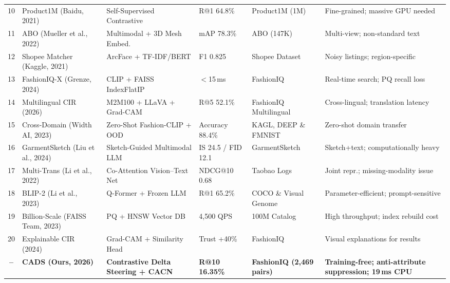 \documentclass[conference]{IEEEtran}
\begin{document}
\begin{table}[!t]
{\begin{tabular}{@{}clllll@{}}
10 & Product1M (Baidu, 2021)~\cite{baidu2021product1m}                   & Self-Supervised Contrastive                    & R@1 64.8\%              & Product1M (1M)               & Fine-grained; massive GPU needed \\
11 & ABO (Mueller et al., 2022)~\cite{mueller2022abo}                    & Multimodal + 3D Mesh Embed.                    & mAP 78.3\%              & ABO (147K)                   & Multi-view; non-standard text \\
12 & Shopee Matcher (Kaggle, 2021)~\cite{kaggle2021shopee}               & ArcFace + TF-IDF/BERT                          & F1 0.825                & Shopee Dataset               & Noisy listings; region-specific \\
13 & FashionIQ-X (Grenze, 2024)~\cite{grenze2024fashioniqx}             & CLIP + FAISS IndexFlatIP                       & $<$15\,ms               & FashionIQ                    & Real-time search; PQ recall loss \\
14 & Multilingual CIR (2026)~\cite{preprint2026multilingual}             & M2M100 + LLaVA + Grad-CAM                     & R@5 52.1\%              & FashionIQ Multilingual       & Cross-lingual; translation latency \\
15 & Cross-Domain (Width AI, 2023)~\cite{width2023crossdomain}           & Zero-Shot Fashion-CLIP + OOD                   & Accuracy 88.4\%         & KAGL, DEEP \& FMNIST         & Zero-shot domain transfer \\
16 & GarmentSketch (Liu et al., 2024)~\cite{liu2024garmentsketch}        & Sketch-Guided Multimodal LLM                   & IS 24.5 / FID 12.1     & GarmentSketch                & Sketch+text; computationally heavy \\
17 & Multi-Trans (Li et al., 2022)~\cite{li2022multitrans}               & Co-Attention Vision--Text Net                  & NDCG@10 0.68            & Taobao Logs                  & Joint repr.; missing-modality issue \\
18 & BLIP-2 (Li et al., 2023)~\cite{li2023blip2}                        & Q-Former + Frozen LLM                          & R@1 65.2\%              & COCO \& Visual Genome        & Parameter-efficient; prompt-sensitive \\
19 & Billion-Scale (FAISS Team, 2023)~\cite{faiss2023billion}            & PQ + HNSW Vector DB                            & 4{,}500 QPS             & 100M Catalog                 & High throughput; index rebuild cost \\
20 & Explainable CIR (2024)~\cite{preprint2024explainable}               & Grad-CAM + Similarity Head                     & Trust +40\%             & FashionIQ                    & Visual explanations for results \\ \midrule
\textbf{--} & \textbf{CADS (Ours, 2026)} & \textbf{Contrastive Delta Steering + CACN} & \textbf{R@10 16.35\%} & \textbf{FashionIQ (2{,}469 pairs)} & \textbf{Training-free; anti-attribute suppression; 19\,ms CPU} \\ \bottomrule
\end{tabular}%
}
\end{table}
\end{document}
